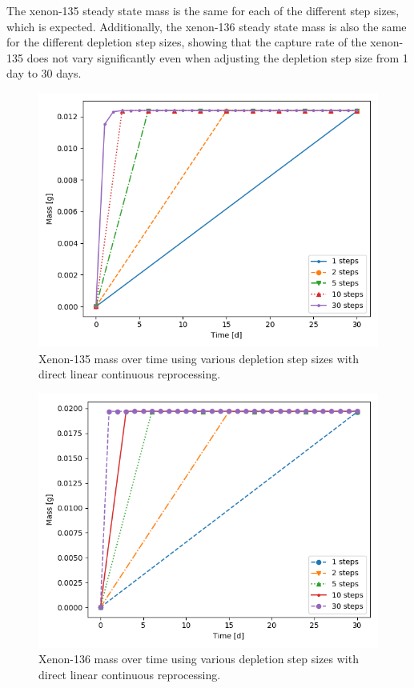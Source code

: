 The xenon-135 steady state mass is the same for each of the different step sizes, which is expected. Additionally, the xenon-136 steady state mass is also the same for the different depletion step sizes, showing that the capture rate of the xenon-135 does not vary significantly even when adjusting the depletion step size from 1 day to 30 days.

\begin{figure}[H]
  \centering
  \includegraphics[scale=0.5]{images/DL_NSTEP_Xe-135_mass.png}
  \caption{Xenon-135 mass over time using various depletion step sizes with direct linear continuous reprocessing.}
   \label{fig:DL-cont-xe135}
\end{figure}

\begin{figure}[H]
  \centering
  \includegraphics[scale=0.5]{images/DL_NSTEP_Xe-136_mass.png}
  \caption{Xenon-136 mass over time using various depletion step sizes with direct linear continuous reprocessing.}
   \label{fig:DL-cont-xe136}
\end{figure}

